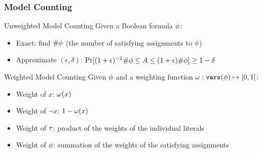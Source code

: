 \begin{frame}
    \frametitle{Model Counting}
    \begin{block}{Unweighted Model Counting}
        Given a Boolean formula $\phi$:
        \pause
        \begin{itemize}
            \item Exact: find $\#\phi$ (the number of satisfying assignments to $\phi$)
                  \pause
            \item Approximate $(\epsilon,\delta)$: $\Pr[(1+\epsilon)^{-1}\#\phi \leq A \leq (1+\epsilon)\#\phi] \geq 1-\delta$
        \end{itemize}
    \end{block}
    \pause
    \begin{block}{Weighted Model Counting}
        Given $\phi$ and a weighting function $\omega:\texttt{vars}(\phi)\mapsto[0,1]$:
        \pause
        \begin{itemize}
            \item Weight of $x$: $\omega(x)$
                  \pause
            \item Weight of $\lnot x$: $1-\omega(x)$
                  \pause
            \item Weight of $\tau$: product of the weights of the individual literals
                  \pause
            \item Weight of $\phi$: summation of the weights of the satisfying assignments
        \end{itemize}
    \end{block}
\end{frame}